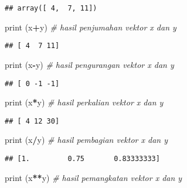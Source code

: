 \documentclass[
]{docs}
\newenvironment{Shaded}{\begin{snugshade}}{\end{snugshade}}
\newcommand{\BuiltInTok}[1]{#1}
\newcommand{\CommentTok}[1]{\textcolor[rgb]{0.56,0.35,0.01}{\textit{#1}}}
\newcommand{\NormalTok}[1]{#1}
\newcommand{\OperatorTok}[1]{\textcolor[rgb]{0.81,0.36,0.00}{\textbf{#1}}}
\begin{document}
\begin{verbatim}
## array([ 4,  7, 11])
\end{verbatim}

\begin{Shaded}
\begin{Highlighting}[]
\BuiltInTok{print}\NormalTok{ (x}\OperatorTok{+}\NormalTok{y)             }\CommentTok{\# hasil penjumahan vektor x dan y}
\end{Highlighting}
\end{Shaded}

\begin{verbatim}
## [ 4  7 11]
\end{verbatim}

\begin{Shaded}
\begin{Highlighting}[]
\BuiltInTok{print}\NormalTok{ (x}\OperatorTok{{-}}\NormalTok{y)             }\CommentTok{\# hasil pengurangan vektor x dan y}
\end{Highlighting}
\end{Shaded}

\begin{verbatim}
## [ 0 -1 -1]
\end{verbatim}

\begin{Shaded}
\begin{Highlighting}[]
\BuiltInTok{print}\NormalTok{ (x}\OperatorTok{*}\NormalTok{y)             }\CommentTok{\# hasil perkalian vektor x dan y}
\end{Highlighting}
\end{Shaded}

\begin{verbatim}
## [ 4 12 30]
\end{verbatim}

\begin{Shaded}
\begin{Highlighting}[]
\BuiltInTok{print}\NormalTok{ (x}\OperatorTok{/}\NormalTok{y)             }\CommentTok{\# hasil pembagian vektor x dan y}
\end{Highlighting}
\end{Shaded}

\begin{verbatim}
## [1.         0.75       0.83333333]
\end{verbatim}

\begin{Shaded}
\begin{Highlighting}[]
\BuiltInTok{print}\NormalTok{ (x}\OperatorTok{**}\NormalTok{y)            }\CommentTok{\# hasil pemangkatan vektor x dan y}
\end{Highlighting}
\end{Shaded}
\end{document}
